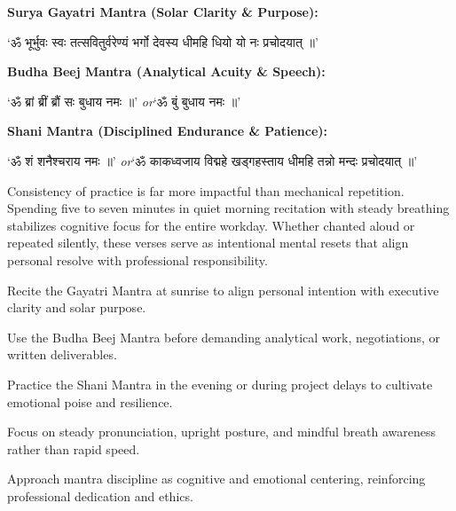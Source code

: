 \begin{center}
  {\fontsize{8.5}{11.5}\selectfont\textbf{Surya Gayatri Mantra (Solar Clarity \& Purpose):}\par
  ‘ॐ भूर्भुवः स्वः तत्सवितुर्वरेण्यं भर्गो देवस्य धीमहि धियो यो नः प्रचोदयात् ॥’}\par\vspace{1.5mm}
  {\fontsize{8.5}{11.5}\selectfont\textbf{Budha Beej Mantra (Analytical Acuity \& Speech):}\par
  ‘ॐ ब्रां ब्रीं ब्रौं सः बुधाय नमः ॥’ \quad\textit{or}\quad ‘ॐ बुं बुधाय नमः ॥’}\par\vspace{1.5mm}
  {\fontsize{8.5}{11.5}\selectfont\textbf{Shani Mantra (Disciplined Endurance \& Patience):}\par
  ‘ॐ शं शनैश्चराय नमः ॥’ \quad\textit{or}\quad ‘ॐ काकध्वजाय विद्महे खड्गहस्ताय धीमहि तन्नो मन्दः प्रचोदयात् ॥’}\par\vspace{1.8mm}
\end{center}

{\fontsize{9}{13}\selectfont Consistency of practice is far more impactful than mechanical repetition. Spending five to seven minutes in quiet morning recitation with steady breathing stabilizes cognitive focus for the entire workday. Whether chanted aloud or repeated silently, these verses serve as intentional mental resets that align personal resolve with professional responsibility.}\par\vspace{1.8mm}

\begin{diamondlist}
  \item {\fontsize{8.5}{12}\selectfont Recite the Gayatri Mantra at sunrise to align personal intention with executive clarity and solar purpose.}
  \item {\fontsize{8.5}{12}\selectfont Use the Budha Beej Mantra before demanding analytical work, negotiations, or written deliverables.}
  \item {\fontsize{8.5}{12}\selectfont Practice the Shani Mantra in the evening or during project delays to cultivate emotional poise and resilience.}
  \item {\fontsize{8.5}{12}\selectfont Focus on steady pronunciation, upright posture, and mindful breath awareness rather than rapid speed.}
  \item {\fontsize{8.5}{12}\selectfont Approach mantra discipline as cognitive and emotional centering, reinforcing professional dedication and ethics.}
\end{diamondlist}

